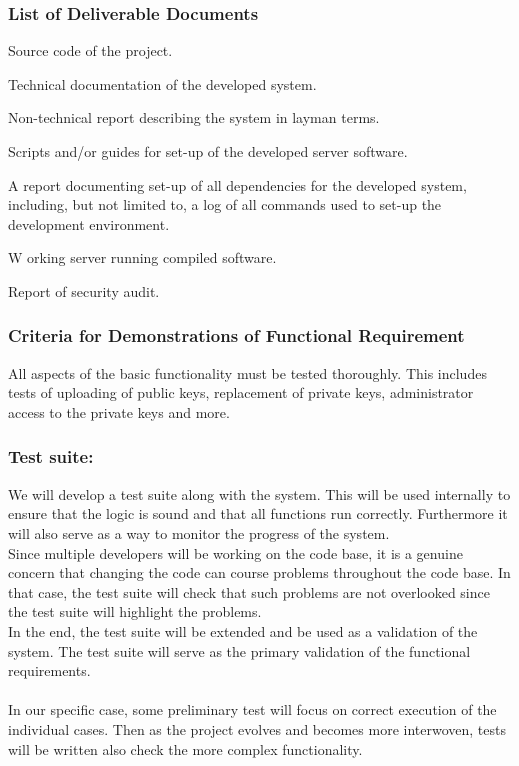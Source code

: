 \documentclass[11pt,a4paper]{article}
\let\OldItem\item
\newcommand{\SubItemStart}[1]{%
    \let\item\SubItemEnd
    \begin{SubItemList}[resume]%
        \OldItem #1%
}
\newcommand{\SubItemMiddle}[1]{%
    \OldItem #1%
}
\newcommand{\SubItemEnd}[1]{%
    \end{SubItemList}%
    \let\item\OldItem
    \item #1%
}
\newcommand*{\SubItem}[1]{%
    \let\SubItem\SubItemMiddle%
    \SubItemStart{#1}%
}%
\begin{document}
\subsubsection{List of Deliverable Documents}\label{sec:deliverables}
\begin{itemize}
\item Source code of the project.
\item Technical documentation of the developed system.
\item Non-technical report describing the system in layman terms.
\item Scripts and/or guides for set-up of the developed server software.
\SubItem A report documenting set-up of all dependencies for the developed system, including, but not limited to, a log of all commands used to set-up the development environment.
\item Working server running compiled software.
\item Report of security audit.
\end{itemize}
\subsubsection{Criteria for Demonstrations of Functional Requirement}
All aspects of the basic functionality must be tested thoroughly. This includes tests of uploading of public keys, replacement of private keys, administrator access to the private keys and more.

\subsubsection{Test suite:}

We will develop a test suite along with the system. This will be used internally to ensure that the logic is sound and that all functions run correctly. Furthermore it will also serve as a way to monitor the progress of the system.\\
Since multiple developers will be working on the code base, it is a genuine concern that changing the code can course problems throughout the code base. In that case, the test suite will check that such problems are not overlooked since the test suite will highlight the problems.\\
In the end, the test suite will be extended and be used as a validation of the system. The test suite will serve as the primary validation of the functional requirements. \\\\
In our specific case, some preliminary test will focus on correct execution of the individual cases. Then as the project evolves and becomes more interwoven, tests will be written also check the more complex functionality.
\end{document}
